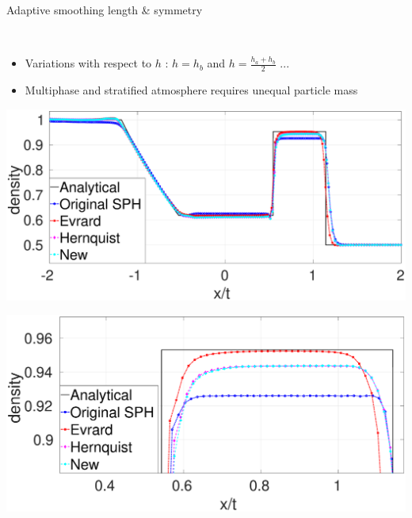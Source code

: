 \documentclass{beamer}
\begin{document}
\begin{frame}{Adaptive smoothing length \& symmetry}
\begin{minipage}{.32\textwidth}
\end{minipage}%
\\
\begin{itemize}
\item Variations with respect to $h$ :
$h=h_b$ and $h= \frac{h_a+h_b}{2}$ ...
\item Multiphase and stratified atmosphere requires unequal particle mass
\end{itemize}
\center
\begin{minipage}{.42\textwidth}
        \centering
        \includegraphics[width=0.808 \textwidth]{./Chapter-3/Figures/SM-Adapt-MEs}
\end{minipage}%
\begin{minipage}{.42\textwidth}
        \centering
        \includegraphics[width=0.808 \textwidth]{./Chapter-3/Figures/SM-Adapt-MEs-zoom}
\end{minipage}%

\end{frame}
\end{document}
